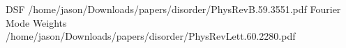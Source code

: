 \documentclass[aps,prb,preprint,superscriptaddress,amsmath,amssymb,floatfix]{revtex4}
\begin{document}
DSF
/home/jason/Downloads/papers/disorder/PhysRevB.59.3551.pdf
Fourier Mode Weights
/home/jason/Downloads/papers/disorder/PhysRevLett.60.2280.pdf

\end{document}
